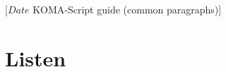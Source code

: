 %
%
%
%
%
%
%
%
% 
%
%
%
%

%
                 [$Date$
                  KOMA-Script guide (common paragraphs)]

\section{Listen}
%
\BeginIndexGroup
{}%

